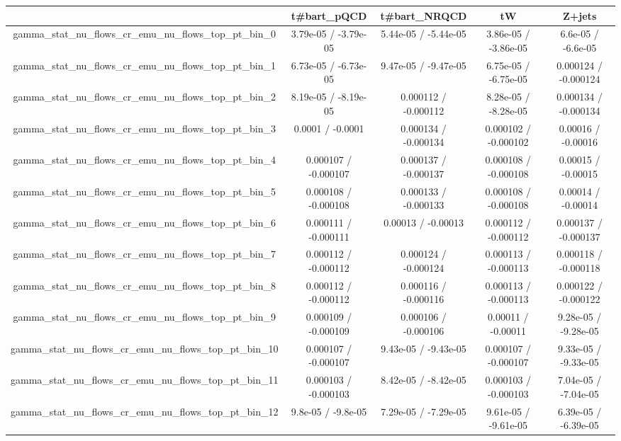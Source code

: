 \documentclass[10pt]{article}
\begin{document}
\begin{table}[htbp]
\begin{center}
\begin{tabular}{|c|c|c|c|c|}
\hline 
      & t#bar{t}_{pQCD}      & t#bar{t}_{NRQCD}      & tW      & Z+jets \\ 
\hline 
  gamma_stat_nu_flows_cr_emu_nu_flows_top_pt_bin_0 & 3.79e-05 / -3.79e-05 & 5.44e-05 / -5.44e-05 & 3.86e-05 / -3.86e-05 & 6.6e-05 / -6.6e-05 \\ 
  gamma_stat_nu_flows_cr_emu_nu_flows_top_pt_bin_1 & 6.73e-05 / -6.73e-05 & 9.47e-05 / -9.47e-05 & 6.75e-05 / -6.75e-05 & 0.000124 / -0.000124 \\ 
  gamma_stat_nu_flows_cr_emu_nu_flows_top_pt_bin_2 & 8.19e-05 / -8.19e-05 & 0.000112 / -0.000112 & 8.28e-05 / -8.28e-05 & 0.000134 / -0.000134 \\ 
  gamma_stat_nu_flows_cr_emu_nu_flows_top_pt_bin_3 & 0.0001 / -0.0001 & 0.000134 / -0.000134 & 0.000102 / -0.000102 & 0.00016 / -0.00016 \\ 
  gamma_stat_nu_flows_cr_emu_nu_flows_top_pt_bin_4 & 0.000107 / -0.000107 & 0.000137 / -0.000137 & 0.000108 / -0.000108 & 0.00015 / -0.00015 \\ 
  gamma_stat_nu_flows_cr_emu_nu_flows_top_pt_bin_5 & 0.000108 / -0.000108 & 0.000133 / -0.000133 & 0.000108 / -0.000108 & 0.00014 / -0.00014 \\ 
  gamma_stat_nu_flows_cr_emu_nu_flows_top_pt_bin_6 & 0.000111 / -0.000111 & 0.00013 / -0.00013 & 0.000112 / -0.000112 & 0.000137 / -0.000137 \\ 
  gamma_stat_nu_flows_cr_emu_nu_flows_top_pt_bin_7 & 0.000112 / -0.000112 & 0.000124 / -0.000124 & 0.000113 / -0.000113 & 0.000118 / -0.000118 \\ 
  gamma_stat_nu_flows_cr_emu_nu_flows_top_pt_bin_8 & 0.000112 / -0.000112 & 0.000116 / -0.000116 & 0.000113 / -0.000113 & 0.000122 / -0.000122 \\ 
  gamma_stat_nu_flows_cr_emu_nu_flows_top_pt_bin_9 & 0.000109 / -0.000109 & 0.000106 / -0.000106 & 0.00011 / -0.00011 & 9.28e-05 / -9.28e-05 \\ 
  gamma_stat_nu_flows_cr_emu_nu_flows_top_pt_bin_10 & 0.000107 / -0.000107 & 9.43e-05 / -9.43e-05 & 0.000107 / -0.000107 & 9.33e-05 / -9.33e-05 \\ 
  gamma_stat_nu_flows_cr_emu_nu_flows_top_pt_bin_11 & 0.000103 / -0.000103 & 8.42e-05 / -8.42e-05 & 0.000103 / -0.000103 & 7.04e-05 / -7.04e-05 \\ 
  gamma_stat_nu_flows_cr_emu_nu_flows_top_pt_bin_12 & 9.8e-05 / -9.8e-05 & 7.29e-05 / -7.29e-05 & 9.61e-05 / -9.61e-05 & 6.39e-05 / -6.39e-05 \\ 

\end{tabular}
\end{center}
\end{table}
\end{document}
